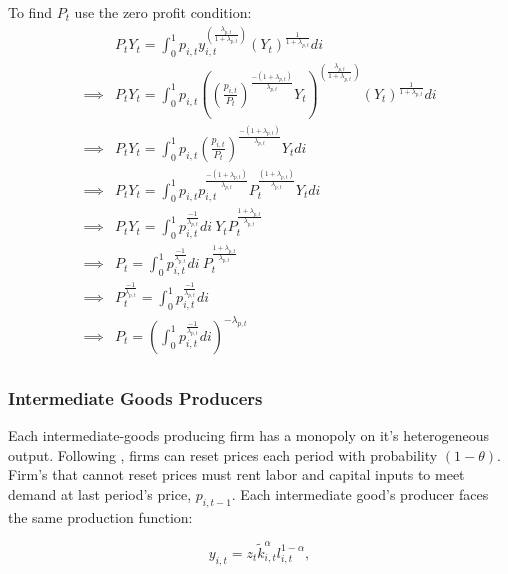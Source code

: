 \documentclass[article,11pt,letterpaper,fleqn]{article}
\theoremstyle{definition}
\numberwithin{equation}{section}
\newcommand{\cn}{\citeasnoun} %
\begin{document}
To find $P_{t}$ use the zero profit condition:
\begin{equation}
\begin{split}
& P_{t}Y_{t} = \int_{0}^{1}p_{i,t}y_{i,t}^{\left(\frac{\lambda_{p,t}}{1+\lambda_{p,t}}\right)}(Y_{t})^{\frac{1}{1+\lambda_{p,t}}}di \\
\implies & P_{t}Y_{t} = \int_{0}^{1}p_{i,t}\left(\left(\frac{p_{i,t}}{P_{t}}\right)^{\frac{-(1+\lambda_{p,t})}{\lambda_{p,t}}}Y_{t}\right)^{\left(\frac{\lambda_{p,t}}{1+\lambda_{p,t}}\right)}(Y_{t})^{\frac{1}{1+\lambda_{p,t}}}di \\
\implies & P_{t}Y_{t} = \int_{0}^{1}p_{i,t}\left(\frac{p_{i,t}}{P_{t}}\right)^{\frac{-(1+\lambda_{p,t})}{\lambda_{p,t}}}Y_{t}di \\
\implies & P_{t}Y_{t} = \int_{0}^{1}p_{i,t}p_{i,t}^{\frac{-(1+\lambda_{p,t})}{\lambda_{p,t}}}P_{t}^{\frac{(1+\lambda_{p,t})}{\lambda_{p,t}}}Y_{t}di \\
\implies & P_{t}Y_{t} = \int_{0}^{1}p_{i,t}^{\frac{-1}{\lambda_{p,t}}}di \:  Y_{t}P_{t}^{\frac{1+\lambda_{p,t}}{\lambda_{p,t}}} \\
\implies & P_{t} = \int_{0}^{1}p_{i,t}^{\frac{-1}{\lambda_{p,t}}}di \: P_{t}^{\frac{1+\lambda_{p,t}}{\lambda_{p,t}}} \\
\implies & P_{t}^{\frac{-1}{\lambda_{p,t}}} = \int_{0}^{1}p_{i,t}^{\frac{-1}{\lambda_{p,t}}}di \\
\implies & P_{t} = \left(\int_{0}^{1}p_{i,t}^{\frac{-1}{\lambda_{p,t}}}di\right)^{-\lambda_{p,t}} \\
\end{split}
\end{equation}



\subsubsection{Intermediate Goods Producers}

Each intermediate-goods producing firm has a monopoly on it's heterogeneous output.  Following \cn{Calvo1983}, firms can reset prices each period with probability $(1-\theta)$.  Firm's that cannot reset prices must rent labor and capital inputs to meet demand at last period's price, $p_{i,t-1}$.  Each intermediate good's producer faces the same production function:

\begin{equation}
\label{int_prodfunc}
y_{i,t}=z_{t}\tilde{k}_{i,t}^{\alpha}l_{i,t}^{1-\alpha},
\end{equation}
\end{document}
